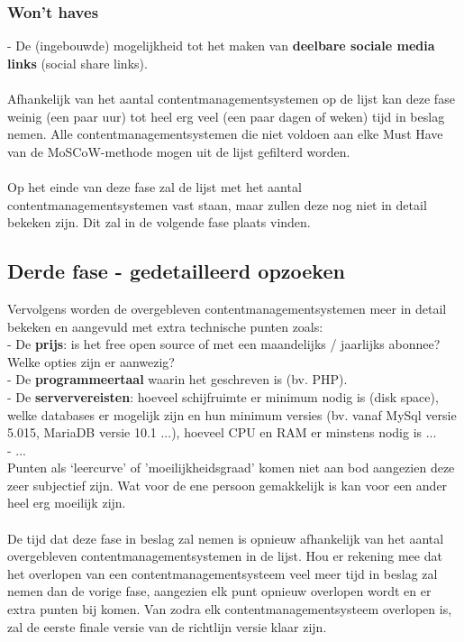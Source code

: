 \subsubsection{Won't haves}
- De (ingebouwde) mogelijkheid tot het maken van \textbf{deelbare sociale media links} (social share links).
\\\\
Afhankelijk van het aantal contentmanagementsystemen op de lijst kan deze fase weinig (een paar uur) tot heel erg veel (een paar dagen of weken) tijd in beslag nemen. Alle contentmanagementsystemen die niet voldoen aan elke Must Have van de MoSCoW-methode mogen uit de lijst gefilterd worden. 
\\\\
Op het einde van deze fase zal de lijst met het aantal contentmanagementsystemen vast staan, maar zullen deze nog niet in detail bekeken zijn. Dit zal in de volgende fase plaats vinden.

\subsection{Derde fase - gedetailleerd opzoeken}
Vervolgens worden de overgebleven contentmanagementsystemen meer in detail bekeken en aangevuld met extra technische punten zoals:\\
- De \textbf{prijs}: is het free open source of met een maandelijks / jaarlijks abonnee? Welke opties zijn er aanwezig?\\
- De \textbf{programmeertaal} waarin het geschreven is (bv. PHP).\\
- De \textbf{serververeisten}: hoeveel schijfruimte er minimum nodig is (disk space), welke databases er mogelijk zijn en hun minimum versies (bv. vanaf MySql versie 5.015, MariaDB versie 10.1 ...), hoeveel CPU en RAM er minstens nodig is ...\\ 
- ... \\
Punten als `leercurve' of 'moeilijkheidsgraad' komen niet aan bod aangezien deze zeer subjectief zijn. Wat voor de ene persoon gemakkelijk is kan voor een ander heel erg moeilijk zijn.
\\\\
De tijd dat deze fase in beslag zal nemen is opnieuw afhankelijk van het aantal overgebleven contentmanagementsystemen in de lijst. Hou er rekening mee dat het overlopen van een contentmanagementsysteem veel meer tijd in beslag zal nemen dan de vorige fase, aangezien elk punt opnieuw overlopen wordt en er extra punten bij komen. Van zodra elk contentmanagementsysteem overlopen is, zal de eerste finale versie van de richtlijn versie klaar zijn.

